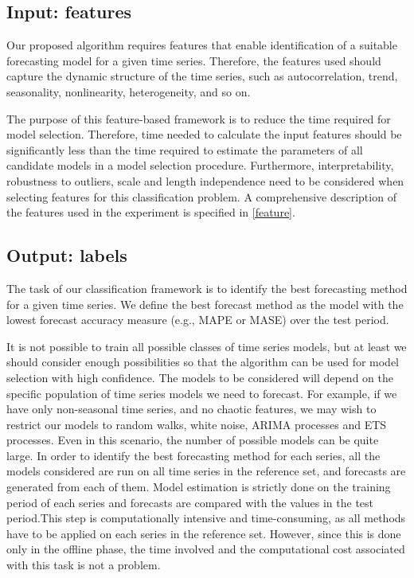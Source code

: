 \documentclass[11pt,a4paper,]{article}
\theoremstyle{definition}
\theoremstyle{definition}
\theoremstyle{definition}
\theoremstyle{remark}
\begin{document}
\subsection{Input: features}\label{input-features}

Our proposed algorithm requires features that enable identification of a
suitable forecasting model for a given time series. Therefore, the
features used should capture the dynamic structure of the time series,
such as autocorrelation, trend, seasonality, nonlinearity,
heterogeneity, and so on.

The purpose of this feature-based framework is to reduce the time
required for model selection. Therefore, time needed to calculate the
input features should be significantly less than the time required to
estimate the parameters of all candidate models in a model selection
procedure. Furthermore, interpretability, robustness to outliers, scale
and length independence need to be considered when selecting features
for this classification problem. A comprehensive description of the
features used in the experiment is specified in \autoref{feature}.

\subsection{Output: labels}\label{output-labels}

The task of our classification framework is to identify the best
forecasting method for a given time series. We define the best forecast
method as the model with the lowest forecast accuracy measure (e.g.,
MAPE or MASE) over the test period.

It is not possible to train all possible classes of time series models,
but at least we should consider enough possibilities so that the
algorithm can be used for model selection with high confidence. The
models to be considered will depend on the specific population of time
series models we need to forecast. For example, if we have only
non-seasonal time series, and no chaotic features, we may wish to
restrict our models to random walks, white noise, ARIMA processes and
ETS processes. Even in this scenario, the number of possible models can
be quite large. In order to identify the best forecasting method for
each series, all the models considered are run on all time series in the
reference set, and forecasts are generated from each of them. Model
estimation is strictly done on the training period of each series and
forecasts are compared with the values in the test period.This step is
computationally intensive and time-consuming, as all methods have to be
applied on each series in the reference set. However, since this is done
only in the offline phase, the time involved and the computational cost
associated with this task is not a problem.
\end{document}
